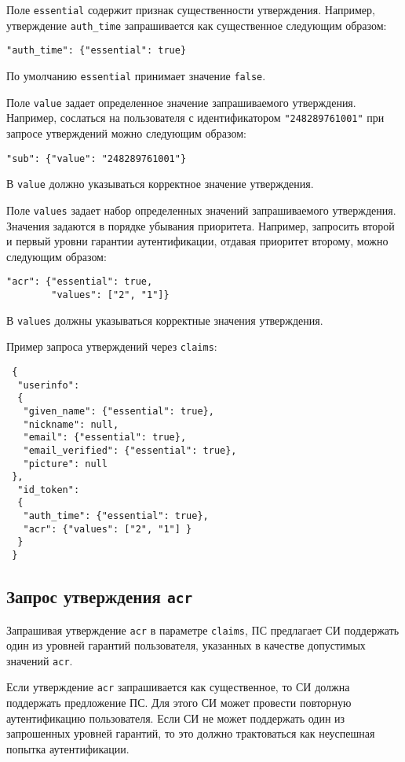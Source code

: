 Поле \lstinline{essential} содержит признак существенности утверждения. 
Например, утверждение \lstinline{auth_time} запрашивается как 
существенное следующим образом: 
\begin{lstlisting}
"auth_time": {"essential": true}
\end{lstlisting}

По умолчанию \lstinline{essential} принимает значение \lstinline{false}.

Поле \lstinline{value} задает определенное значение запрашиваемого 
утверждения. Например, сослаться на пользователя с идентификатором 
\lstinline{"248289761001"} при запросе утверждений можно следующим образом:
\begin{lstlisting}
"sub": {"value": "248289761001"}
\end{lstlisting}

В \lstinline{value} должно указываться корректное значение утверждения. 

Поле \lstinline{values} задает набор определенных значений запрашиваемого 
утверждения. Значения задаются в порядке убывания приоритета.
%
Например, запросить второй и первый уровни гарантии аутентификации,
отдавая приоритет второму, можно следующим образом:
\begin{lstlisting}
"acr": {"essential": true,
        "values": ["2", "1"]}
\end{lstlisting}

В \lstinline{values} должны указываться корректные значения утверждения.

Пример запроса утверждений через \lstinline{claims}:
\begin{lstlisting}
 {
  "userinfo":
  {
   "given_name": {"essential": true},
   "nickname": null,
   "email": {"essential": true},
   "email_verified": {"essential": true},
   "picture": null
 },
  "id_token":
  {
   "auth_time": {"essential": true},
   "acr": {"values": ["2", "1"] }
  }
 }
\end{lstlisting}

\subsection{Запрос утверждения \lstinline{acr}}\label{CLAIMS.ReqAcr}

Запрашивая утверждение \lstinline{acr} в параметре \lstinline{claims}, ПС 
предлагает СИ поддержать один из уровней гарантий пользователя, указанных в 
качестве допустимых значений \lstinline{acr}. 

Если утверждение \lstinline{acr} запрашивается как существенное,
то СИ должна поддержать предложение ПС. 
%
Для этого СИ может провести повторную аутентификацию пользователя. 
%
Если СИ не может поддержать один из запрошенных уровней гарантий, 
то это должно трактоваться как неуспешная попытка аутентификации.

